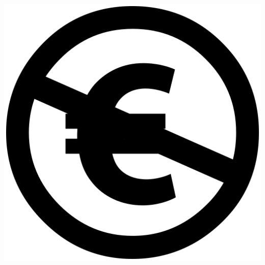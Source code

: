\begin{center}
\includegraphics[scale=0.02]{./Images/Chapter00/nc-eu-xlarge.png}
\end{center}


\vfill

